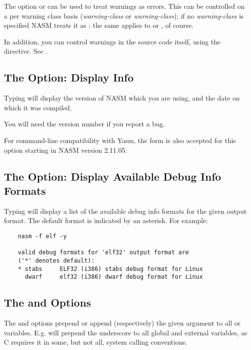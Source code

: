The option  or  can be used to treat warnings
as errors. This can be controlled on a per warning class basis
(\emph{warning-class} or \emph{warning-class});
if no \emph{warning-class} is specified NASM treats it as
; the same applies to  or
, of course.

In addition, you can control warnings in the source code itself, using
the \codeindex{[WARNING]} directive. See .

\subsection{The  Option: Display  Info}
\label{subsec:opt-v}

Typing  will display the version of NASM which you are using,
and the date on which it was compiled.

You will need the version number if you report a bug.

For command-line compatibility with Yasm, the form  is also
accepted for this option starting in NASM version 2.11.05.

\subsection{The  Option: Display Available Debug Info Formats}
\label{subsec:opt-y}

Typing  will display a list of the available
debug info formats for the given output format. The default format
is indicated by an asterisk. For example:

\begin{lstlisting}
	nasm -f elf -y

	valid debug formats for 'elf32' output format are
	('*' denotes default):
	* stabs     ELF32 (i386) stabs debug format for Linux
	  dwarf     elf32 (i386) dwarf debug format for Linux
\end{lstlisting}

\subsection{The  and  Options}
\label{subsec:opt-pfix}

The  and  options prepend or append
(respectively) the given argument to all  or
 variables. E.g.  will prepend the
underscore to all global and external variables, as C requires it in
some, but not all, system calling conventions.

